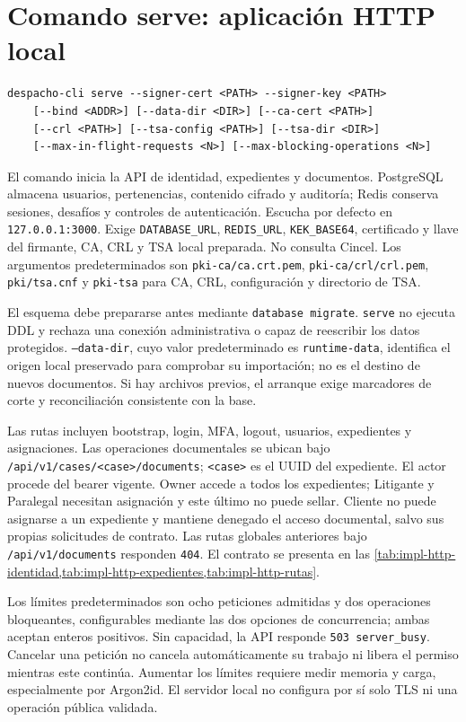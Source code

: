 \section{Comando serve: aplicación HTTP local}\label{sec:cli-serve}

\begin{lstlisting}[numbers=none]
despacho-cli serve --signer-cert <PATH> --signer-key <PATH>
    [--bind <ADDR>] [--data-dir <DIR>] [--ca-cert <PATH>]
    [--crl <PATH>] [--tsa-config <PATH>] [--tsa-dir <DIR>]
    [--max-in-flight-requests <N>] [--max-blocking-operations <N>]
\end{lstlisting}

El comando inicia la API de identidad, expedientes y documentos. PostgreSQL
almacena usuarios, pertenencias, contenido cifrado y auditoría; Redis conserva
sesiones, desafíos y controles de autenticación. Escucha por defecto en
\texttt{127.0.0.1:3000}. Exige \texttt{DATABASE\_URL}, \texttt{REDIS\_URL},
\texttt{KEK\_BASE64}, certificado y llave del firmante, CA, CRL y TSA local
preparada. No consulta Cincel. Los argumentos predeterminados son
\texttt{pki-ca/ca.crt.pem}, \texttt{pki-ca/crl/crl.pem}, \texttt{pki/tsa.cnf}
y \texttt{pki-tsa} para CA, CRL, configuración y directorio de TSA.

El esquema debe prepararse antes mediante \texttt{database migrate}.
\texttt{serve} no ejecuta DDL y rechaza una conexión administrativa o capaz de
reescribir los datos protegidos. \texttt{--data-dir}, cuyo valor predeterminado
es \texttt{runtime-data}, identifica el origen local preservado para comprobar
su importación; no es el destino de nuevos documentos. Si hay archivos previos,
el arranque exige marcadores de corte y reconciliación consistente con la base.

Las rutas incluyen bootstrap, login, MFA, logout, usuarios, expedientes y
asignaciones. Las operaciones documentales se ubican bajo
\texttt{/api/v1/cases/<case>/documents}; \texttt{<case>} es el UUID del expediente.
El actor procede del bearer vigente. Owner accede a todos los expedientes;
Litigante y Paralegal necesitan asignación y este último no puede sellar.
Cliente no puede asignarse a un expediente y mantiene denegado el acceso
documental, salvo sus propias solicitudes de contrato. Las rutas globales anteriores bajo \texttt{/api/v1/documents}
responden \texttt{404}. El contrato se presenta en las
\cref{tab:impl-http-identidad,tab:impl-http-expedientes,tab:impl-http-rutas}.

Los límites predeterminados son ocho peticiones admitidas y dos operaciones
bloqueantes, configurables mediante las dos opciones de concurrencia; ambas
aceptan enteros positivos. Sin capacidad, la API responde
\texttt{503 server\_busy}. Cancelar una petición no cancela automáticamente
su trabajo ni libera el permiso mientras este continúa. Aumentar los límites
requiere medir memoria y carga, especialmente por Argon2id. El servidor local
no configura por sí solo TLS ni una operación pública validada.

